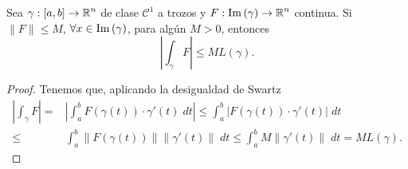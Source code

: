 \begin{prop}[Monotonía]
	Sea $\displaystyle \gamma : \left[a,b\right] \to \mathbb{R}^{n} $ de clase $\displaystyle \mathcal{C}^{1} $ a trozos y $\displaystyle F : \operatorname{Im}\left(\gamma \right)\to \mathbb{R}^{n} $ continua. Si $\displaystyle \|F\|\leq M $, $\displaystyle \forall x \in \operatorname{Im}\left(\gamma \right) $, para algún $\displaystyle M > 0 $, entonces
\[ \left|\int _{\gamma }F \right|\leq ML\left(\gamma \right) .\]
\end{prop}
 \begin{proof}
 Tenemos que, aplicando la desigualdad de Swartz
\[
\begin{split}
	\left|\int _{\gamma }F \right| = & \left|\int^{b}_{a} F\left(\gamma\left(t\right)\right) \cdot \gamma'\left(t\right) \; dt\right|\leq \int^{b}_{a} \left|F\left(\gamma\left(t\right)\right) \cdot \gamma'\left(t\right)\right| \; dt \\
	\leq & \int^{b}_{a} \|F\left(\gamma\left(t\right)\right)\| \|\gamma'\left(t\right)\| \; dt \leq \int^{b}_{a} M \|\gamma'\left(t\right)\| \; dt = ML\left(\gamma \right).
\end{split}
\]
 \end{proof}

